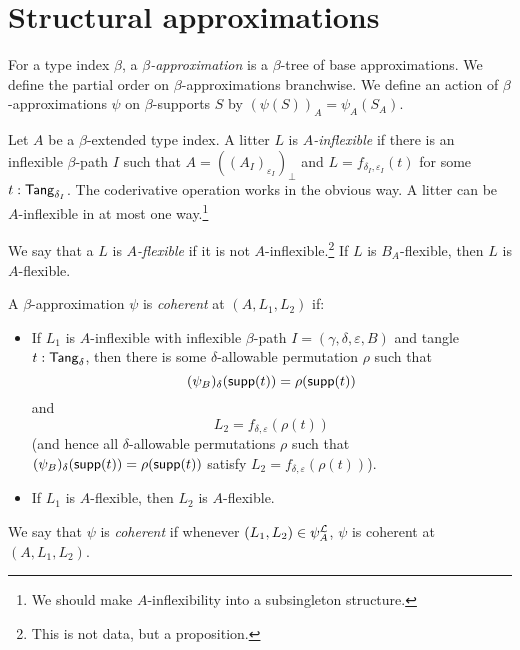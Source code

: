 \section{Structural approximations}
\begin{definition}
  \label{def:StrApprox}
  For a type index \( \beta \), a \emph{\( \beta \)-approximation} is a \( \beta \)-tree of base approximations.
  We define the partial order on \( \beta \)-approximations branchwise.
  We define an action of \( \beta \)-approximations \( \psi \) on \( \beta \)-supports \( S \) by \( (\psi(S))_A = \psi_A(S_A) \).
\end{definition}
\begin{definition}
  \label{def:Inflexible}
  Let \( A \) be a \( \beta \)-extended type index.
  A litter \( L \) is \emph{\( A \)-inflexible} if there is an inflexible \( \beta \)-path \( I \) such that \( A = ((A_I)_{\varepsilon_I})_\bot \) and \( L = f_{\delta_I, \varepsilon_I}(t) \) for some \( t : \mathsf{Tang}_{\delta_I} \).
  The coderivative operation works in the obvious way.
  A litter can be \( A \)-inflexible in at most one way.\footnote{We should make \( A \)-inflexibility into a subsingleton structure.}

  We say that a \( L \) is \emph{\( A \)-flexible} if it is not \( A \)-inflexible.\footnote{This is not data, but a proposition.}
  If \( L \) is \( B_A \)-flexible, then \( L \) is \( A \)-flexible.
\end{definition}
\begin{definition}
  \label{def:StrApprox.Coherent}
  A \( \beta \)-approximation \( \psi \) is \emph{coherent} at \( (A, L_1, L_2) \) if:
  \begin{itemize}
    \item If \( L_1 \) is \( A \)-inflexible with inflexible \( \beta \)-path \( I = (\gamma, \delta, \varepsilon, B) \) and tangle \( t : \mathsf{Tang}_\delta \), then there is some \( \delta \)-allowable permutation \( \rho \) such that
    \[ (\psi_B)_\delta(\operatorname{\mathsf{supp}}(t)) = \rho(\operatorname{\mathsf{supp}}(t)) \]
    and
    \[ L_2 = f_{\delta,\varepsilon}(\rho(t)) \]
    (and hence all \( \delta \)-allowable permutations \( \rho \) such that \( (\psi_B)_\delta(\operatorname{\mathsf{supp}}(t)) = \rho(\operatorname{\mathsf{supp}}(t)) \) satisfy \( L_2 = f_{\delta,\varepsilon}(\rho(t)) \)).
    \item If \( L_1 \) is \( A \)-flexible, then \( L_2 \) is \( A \)-flexible.
  \end{itemize}
  We say that \( \psi \) is \emph{coherent} if whenever \( (L_1, L_2) \in \psi_A^{\mathcal L} \), \( \psi \) is coherent at \( (A, L_1, L_2) \).
\end{definition}

